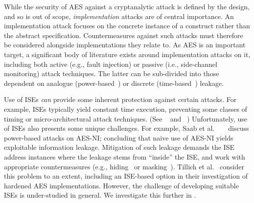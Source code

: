 
While the security of AES against a cryptanalytic attack is defined by
the design, and so is out of scope, {\em implementation} attacks are
of central importance.
An implementation attack focuses on the concrete instance of a construct
rather than the abstract specification.
Countermeasures against such attacks must therefore be
considered alongside implementations they relate to.
As AES is an important target, a significant body of literature exists
around implementation attacks on it, including both
 active (e.g., fault injection)
or
passive (i.e., side-channel monitoring)
attack techniques.
The latter can be sub-divided into those dependent on
analogue
(power-based~\cite{ManOswPop:07})
or
discrete 
(time-based~\cite{KoeQui:99})
leakage.

Use of ISEs
{\em can} provide some inherent protection against certain attacks.
For example,
ISEs typically yield constant time execution,
preventing some classes of timing or micro-architectural
attack techniques.
(See ~\cite[Section 4]{Szefer:19} and ~\cite[Section 4]{GYCH:18})
Unfortunately,
use of ISEs also presents some unique challenges.
For example, 
Saab et al. ~ ~\cite{SaaRohHam:16}
discuss power-based attacks on AES-NI; concluding
that naive use of AES-NI yields exploitable information leakage.
Mitigation of such leakage demands the ISE
address instances where the leakage stems from ``inside'' the ISE,
and work with appropriate countermeasures
(e.g., hiding~\cite[Chapter 7]{ManOswPop:07} or masking~\cite[Chapter 10]{ManOswPop:07}).
Tillich et al.~\cite{TilHerMan:07}
consider this problem to an extent, including an ISE-based option in
their investigation of hardened AES implementations. However, the challenge
of developing suitable ISEs is under-studied in general.
We investigate this further in .

